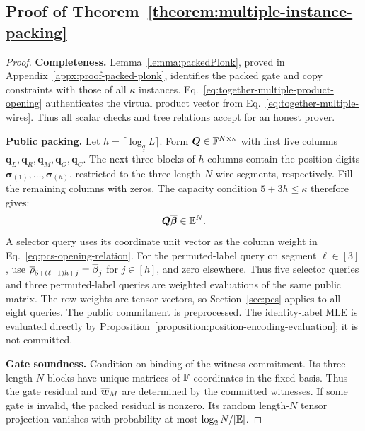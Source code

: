 \subsection{Proof of Theorem~\ref{theorem:multiple-instance-packing}}
\label{appx:proof-multiple-instance}

\begin{proof}
\noindent\textbf{Completeness.}
Lemma~\ref{lemma:packedPlonk}, proved in
Appendix~\ref{appx:proof-packed-plonk}, identifies the packed
gate and copy constraints with those of all \(\kappa\) instances.
Eq.~\eqref{eq:together-multiple-product-opening} authenticates
the virtual product vector from
Eq.~\eqref{eq:together-multiple-wires}.
Thus all scalar checks and tree relations accept for an honest prover.

\smallskip\noindent\textbf{Public packing.}
Let \(h=\lceil\log_{\underline q}L\rceil\).
Form \(\bm Q\in{\mathbb{F}}^{N\times\kappa}\) with first five columns
\(\bm q_L,\bm q_R,\bm q_M,\bm q_O,\bm q_C\).
The next three blocks of \(h\) columns contain the position digits
\(\bm\sigma_{(1)},\ldots,\bm\sigma_{(h)}\), restricted to the
three length-\(N\) wire segments, respectively.
Fill the remaining columns with zeros.
The capacity condition \(5+3h\leq\kappa\) therefore gives:
\[
    \bm Q\overline{\bm\beta}\in\mathbb{E}^N.
\]
A selector query uses its coordinate unit vector as the column
weight in Eq.~\eqref{eq:pcs-opening-relation}.
For the permuted-label query on segment \(\ell\in[3]\), use
\(\overline{\rho}_{5+(\ell-1)h+j}=\overline{\beta}_j\) for \(j\in[h]\),
and zero elsewhere.
Thus five selector queries and three permuted-label queries
are weighted evaluations of the same public matrix.
The row weights are tensor vectors, so Section~\ref{sec:pcs}
applies to all eight queries.
The public commitment is preprocessed.
The identity-label MLE is evaluated directly by
Proposition~\ref{proposition:position-encoding-evaluation};
it is not committed.

\smallskip\noindent\textbf{Gate soundness.}
Condition on binding of the witness commitment.
Its three length-\(N\) blocks have unique matrices of
\({\mathbb{F}}\)-coordinates in the fixed basis.
Thus the gate residual and \(\overline{\bm w}_M\) are determined
by the committed witnesses.
If some gate is invalid, the packed residual is nonzero.
Its random length-\(N\) tensor projection vanishes with
probability at most \(\log_2N/|\mathbb{E}|\).


\end{proof}
